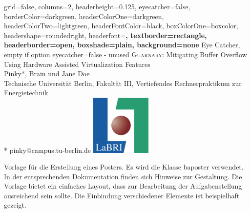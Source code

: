 \documentclass[a0paper,portrait]{baposter}
\begin{document}
	

\color{standardfontcolor}

\begin{poster}{
		grid=false,
		columns=2,
		headerheight=0.125\textheight,
		eyecatcher=false, 
		borderColor=darkgreen,
		headerColorOne=darkgreen,
		headerColorTwo=lightgreen,
		headerFontColor=black,
		boxColorOne=boxcolor,
		headershape=roundedright,
		headerfont=\sffamily\bfseries\Large,
		textborder=rectangle,
		headerborder=open,
		boxshade=plain,
		background=none
	}
	{
		Eye Catcher, empty if option eyecatcher=false - unused
	}
%
{
	\textsf %
	{\Large \textsc{Guarnary}: Mitigating Buffer Overflow Using \break Hardware Assisted Virtualization Features}
}
{\sf\vspace{0.5em}\\
	Pinky*, Brain und Jane Doe
	\vspace{0.1em}\\
	\small{Technische Universität Berlin, Fakultät III, Vertiefendes Rechnerpraktikum zur Energietechnik
	\vspace{0.2em}\\
	* pinky@campus.tu-berlin.de}
}
{\includegraphics[height=3cm]{figures/labri.jpg}} 
%
%
{
Vorlage für die Erstellung eines Posters. Es wird die Klasse baposter verwendet. In der entsprechenden Dokumentation finden sich Hinweise zur Gestaltung. Die Vorlage bietet ein einfaches Layout, dass zur Bearbeitung der Aufgabenstellung ausreichend sein sollte. Die Einbindung verschiedener Elemente ist beispielhaft gezeigt.

}
\end{poster}
\end{document}
